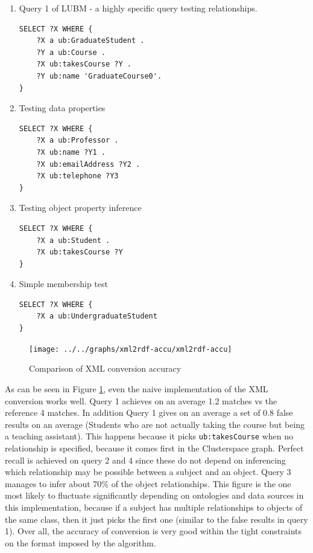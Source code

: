 \documentclass[journal]{IEEEtran}
\begin{document}
\begin{enumerate}
    \item Query 1 of LUBM - a highly specific query testing relationships.
        \begin{verbatim}
SELECT ?X WHERE {
    ?X a ub:GraduateStudent .
    ?Y a ub:Course .
    ?X ub:takesCourse ?Y .
    ?Y ub:name 'GraduateCourse0'.
}
        \end{verbatim}

    \item Testing data properties
        \begin{verbatim}
SELECT ?X WHERE {
    ?X a ub:Professor .
    ?X ub:name ?Y1 .
    ?X ub:emailAddress ?Y2 .
    ?X ub:telephone ?Y3
}
        \end{verbatim}

    \item Testing object property inference
        \begin{verbatim}
SELECT ?X WHERE {
    ?X a ub:Student .
    ?X ub:takesCourse ?Y
}
        \end{verbatim}

    \item Simple membership test
        \begin{verbatim}
SELECT ?X WHERE {
    ?X a ub:UndergraduateStudent
}
        \end{verbatim}
\end{enumerate}

\begin{figure}[h]
    \centering
    \texttt{[image: ../../graphs/xml2rdf-accu/xml2rdf-accu]}
    \caption{Comparison of XML conversion accuracy}
    \label{fig:eval:accu}
\end{figure}

As can be seen in Figure \ref{fig:eval:accu}, even the naive implementation of
the XML conversion works well. Query 1 achieves on an average 1.2 matches vs
the reference 4 matches. In addition Query 1 gives on an average a set of 0.8
false results on an average (Students who are not actually taking the course
but being a teaching assistant). This happens because it picks
\texttt{ub:takesCourse} when no relationship is specified, because it comes
first in the Clusterspace graph. Perfect recall is achieved on query 2 and
4 since these do not depend on inferencing which relationship may be possible
between a subject and an object. Query 3 manages to infer about 70\% of the
object relationships. This figure is the one most likely to fluctuate
significantly depending on ontologies and data sources in this
implementation, because if a subject has multiple relationships to objects of
the same class, then it just picks the first one (similar to the false
results in query 1). Over all, the accuracy of conversion is very good within
the tight constraints on the format imposed by the algorithm.
\end{document}
